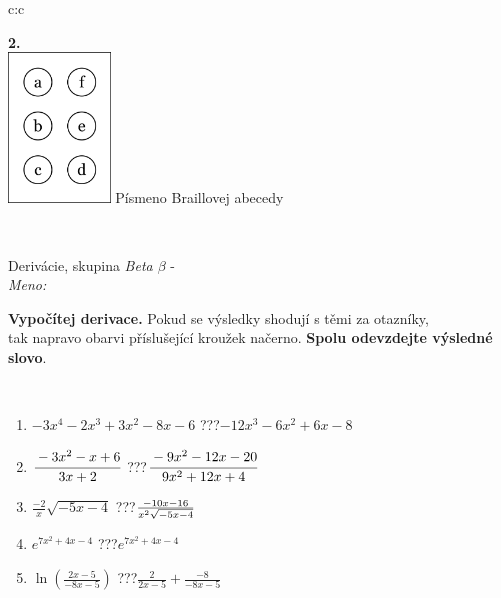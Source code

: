 \documentclass[10pt]{report}
\begin{document}
\begin{tabular}{c:c}
\begin{minipage}[c][104.5mm][t]{0.5\linewidth}
\begin{center}
\begin{minipage}{0.20\linewidth}
\begin{center}
{\Huge\bfseries 2.} \\[2mm]
\includegraphics[height=40mm]{../images/braille.png}
{\small Písmeno Braillovej abecedy}
\end{center}
\end{minipage}
\end{center}
\end{minipage}
\\ \hdashline
\begin{minipage}[c][104.5mm][t]{0.5\linewidth}
\begin{center}
\vspace{7mm}
{\huge Derivácie, skupina \textit{Beta $\beta$} -}\\[5mm]
\textit{Meno:}\phantom{xxxxxxxxxxxxxxxxxxxxxxxxxxxxxxxxxxxxxxxxxxxxxxxxxxxxxxxxxxxxxxxxx}\\[5mm]
\begin{minipage}{0.95\linewidth}
\begin{center}
\textbf{Vypočítej derivace.} Pokud se výsledky shodují s těmi za otazníky,\\tak napravo obarvi příslušející kroužek načerno. \textbf{Spolu odevzdejte výsledné slovo}.
\end{center}
\end{minipage}
\\[1mm]
\begin{minipage}{0.79\linewidth}
\begin{center}
\begin{varwidth}{\linewidth}
\begin{enumerate}
\normalsize
\item $-3x^4-2x^3+3x^2-8x-6$\quad \dotfill\; ???\;\dotfill \quad $-12x^3-6x^2+6x-8$
\item $\cfrac{-3x^2-x+6}{3x+2}$\quad \dotfill\; ???\;\dotfill \quad $\cfrac{-9x^2-12x-20}{9x^2+12x+4}$
\item $\frac{-2}{x}\sqrt{-5x-4}$\quad \dotfill\; ???\;\dotfill \quad $\frac{-10x-16}{x^2 \sqrt{\smash[b]{-5x-4}}}$
\item $e^{7x^2+4x-4}$\quad \dotfill\; ???\;\dotfill \quad $e^{7x^2+4x-4}$
\item $\ln{\left(\frac{2x-5}{-8x-5}\right)}$\quad \dotfill\; ???\;\dotfill \quad $\frac{2}{2x-5}+\frac{-8}{-8x-5}$

\end{enumerate}
\end{varwidth}
\end{center}
\end{minipage}
\end{center}
\end{minipage}
\end{tabular}
\end{document}
